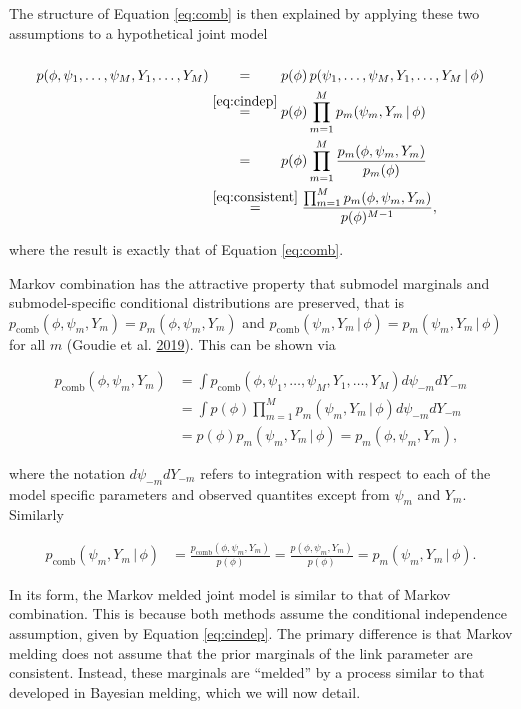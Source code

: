 \documentclass[11pt,]{book}
\begin{document}
The structure of Equation \eqref{eq:comb} is then explained by applying
these two assumptions to a hypothetical joint model

\begin{align}
p(\phi, \psi_1, \ldots, \psi_M, Y_1, \ldots, Y_M)
&\stackrel{\phantom{\eqref{eq:cindep}}}{=} p(\phi) \, p(\psi_1, \ldots, \psi_M, Y_1, \ldots, Y_M \, | \, \phi) \nonumber \\
&\stackrel{\eqref{eq:cindep}}{=} p(\phi) \prod_{m=1}^{M} p_m(\psi_m, Y_m \, | \, \phi) \nonumber \\
&\stackrel{\phantom{\eqref{eq:cindep}}}{=} p(\phi) \prod_{m=1}^M \frac{p_m(\phi, \psi_m, Y_m)}{p_m(\phi)} \label{eq:premeld} \\
&\stackrel{\eqref{eq:consistent}}{=} \frac{\prod_{m=1}^{M} p_m(\phi, \psi_m, Y_m)}{p(\phi)^{M-1}},
\end{align}

where the result is exactly that of Equation \eqref{eq:comb}.

Markov combination has the attractive property that submodel marginals
and submodel-specific conditional distributions are preserved, that is
\(p_{\mathrm{comb}}(\phi, \psi_m, Y_m) = p_m(\phi, \psi_m, Y_m)\) and
\(p_{\mathrm{comb}}(\psi_m, Y_m \, | \, \phi) = p_m(\psi_m, Y_m \, | \, \phi)\)
for all \(m\) (Goudie et al.
\protect\hyperlink{ref-goudie2019joining}{2019}). This can be shown via

\begin{align}
p_{\mathrm{comb}}(\phi, \psi_m, Y_m) &= \int p_{\mathrm{comb}}(\phi, \psi_1, \ldots, \psi_M, Y_1, \ldots, Y_M) d\psi_{-m} dY_{-m} \nonumber \\
&= \int p(\phi) \prod_{m=1}^{M} p_m(\psi_m, Y_m \, | \, \phi) d\psi_{-m} dY_{-m} \nonumber \\
&= p(\phi) p_m(\psi_m, Y_m \, | \, \phi) = p_m(\phi, \psi_m, Y_m),
\end{align}

where the notation \(d\psi_{-m} dY_{-m}\) refers to integration with
respect to each of the model specific parameters and observed quantites
except from \(\psi_m\) and \(Y_m\). Similarly

\begin{align}
p_{\mathrm{comb}}(\psi_m, Y_m \, | \, \phi) &= \frac{p_{\mathrm{comb}}(\phi, \psi_m, Y_m)}{p(\phi)} = \frac{p(\phi, \psi_m, Y_m)}{p(\phi)} = p_m(\psi_m, Y_m \, | \, \phi).
\end{align}

In its form, the Markov melded joint model is similar to that of Markov
combination. This is because both methods assume the conditional
independence assumption, given by Equation \eqref{eq:cindep}. The
primary difference is that Markov melding does not assume that the prior
marginals of the link parameter are consistent. Instead, these marginals
are ``melded'' by a process similar to that developed in Bayesian
melding, which we will now detail.
\end{document}
